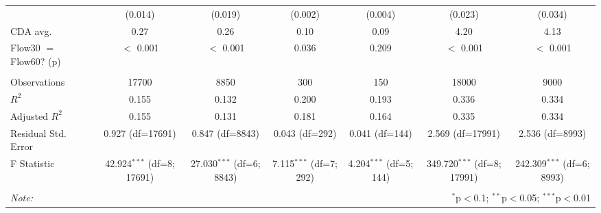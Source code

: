 \begin{table}[!htbp]
\begin{tabular}{@{\extracolsep{5pt}}lcccccc}
& (0.014) & (0.019) & (0.002) & (0.004) & (0.023) & (0.034) \\
 CDA avg. & 0.27 & 0.26 & 0.10 & 0.09 & 4.20 & 4.13 \\
 Flow30 $=$ Flow60? (p) & $<$ 0.001 & $<$ 0.001 & 0.036 & 0.209 & $<$ 0.001 & $<$ 0.001 \\
\hline \\[-1.8ex]
 Observations & 17700 & 8850 & 300 & 150 & 18000 & 9000 \\
 $R^2$ & 0.155 & 0.132 & 0.200 & 0.193 & 0.336 & 0.334 \\
 Adjusted $R^2$ & 0.155 & 0.131 & 0.181 & 0.164 & 0.335 & 0.334 \\
 Residual Std. Error & 0.927 (df=17691) & 0.847 (df=8843) & 0.043 (df=292) & 0.041 (df=144) & 2.569 (df=17991) & 2.536 (df=8993) \\
 F Statistic & 42.924$^{***}$ (df=8; 17691) & 27.030$^{***}$ (df=6; 8843) & 7.115$^{***}$ (df=7; 292) & 4.204$^{***}$ (df=5; 144) & 349.720$^{***}$ (df=8; 17991) & 242.309$^{***}$ (df=6; 8993) \\
\hline
\hline \\[-1.8ex]
\textit{Note:} & \multicolumn{6}{r}{$^{*}$p$<$0.1; $^{**}$p$<$0.05; $^{***}$p$<$0.01} \\
\end{tabular}
\end{table}